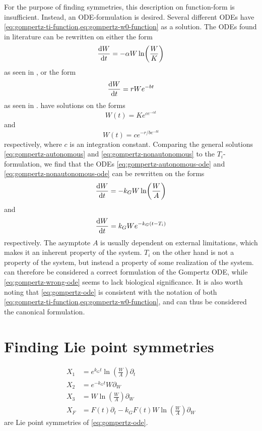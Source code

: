 For the purpose of finding symmetries, this description on function-form is insufficient.
Instead, an ODE-formulation is desired.
Several different ODEs have \cref{eq:gompertz-ti-function,eq:gompertz-w0-function} as a solution.
The ODEs found in literature can be rewritten on either the form
\begin{equation} \label{eq:gompertz-autonomous-ode}
  \dv{W}{t} = -\alpha W \ln(\frac{W}{K})
\end{equation}
as seen in \cite{bajzer1997tumor,delauro2014stochastic}, or the form
\begin{equation} \label{eq:gompertz-nonautonomous-ode}
  \dv{W}{t} = r W e^{-b t}
\end{equation}
as seen in \cite{burger2019epidemic}.
 have solutions on the forms
\begin{equation} \label{eq:gompertz-autonomous}
  W(t) = K e^{c e^{-\alpha t}}
\end{equation}
and
\begin{equation} \label{eq:gompertz-nonautonomous}
  W(t) = c e^{-r/b e^{-b t}}
\end{equation}
respectively, where \(c\) is an integration constant.
Comparing the general solutions \ref{eq:gompertz-autonomous} and \ref{eq:gompertz-nonautonomous} to the \(T_i\)-formulation, we find that the ODEs \ref{eq:gompertz-autonomous-ode} and \ref{eq:gompertz-nonautonomous-ode} can be rewritten on the forms
\begin{equation} \label{eq:gompertz-ode}
  \dv{W}{t} = -k_G W \ln(\frac{W}{A})
\end{equation}
and
\begin{equation} \label{eq:gompertz-wrong-ode}
  \dv{W}{t} = k_G W e^{-k_G (t - T_i)}
\end{equation}
respectively.
The asymptote \(A\) is usually dependent on external limitations, which makes it an inherent property of the system.
\(T_i\) on the other hand is not a property of the system, but instead a property of some realization of the system.
 can therefore be considered a correct formulation of the Gompertz ODE, while \cref{eq:gompertz-wrong-ode} seems to lack biological significance.
It is also worth noting that \cref{eq:gompertz-ode} is consistent with the notation of both \cref{eq:gompertz-ti-function,eq:gompertz-w0-function}, and can thus be considered the canonical formulation.

\section{Finding Lie point symmetries}
\begin{align}
  X_1 &= e^{k_G t} \ln(\frac{W}{A}) \partial_t \\
  X_2 &= e^{-k_G t} W \partial_W \\
  X_3 &= W \ln(\frac{W}{A}) \partial_W \\
  X_F &= F(t) \partial_t - k_G F(t) W \ln(\frac{W}{A}) \partial_W
\end{align}
are Lie point symmetries of \cref{eq:gompertz-ode}.
